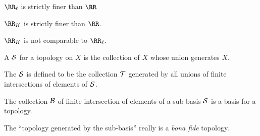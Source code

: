 \begin{thm}
  $\lowerlimRR$ is strictly finer than $\RR$
\end{thm}
\begin{thm}
  $\RR_{K}$ is strictly finer than $\RR$.
\end{thm}
\begin{thm}
  $\RR_{K}$ is not comparable to $\lowerlimRR$.
\end{thm}
\begin{defn}
  A  $\mathcal{S}$ for a topology on $X$ is the
  collection of $X$ whose union generates $X$.

  The  $\mathcal{S}$ is
  defined to be the collection $\mathcal{T}$ generated by all unions of
  finite intersections of elements of $\mathcal{S}$.
\end{defn}

\begin{lemma}
  The collection $\mathcal{B}$ of finite intersection of elements of a
  sub-basis $\mathcal{S}$ is a basis for a topology.
\end{lemma}
\begin{thm}
  The ``topology generated by the sub-basis'' really is a \emph{bona
    fide} topology.
\end{thm}
